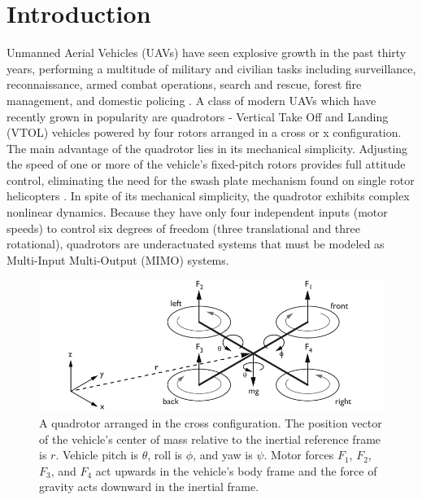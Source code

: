 \chapter{Introduction}

Unmanned Aerial Vehicles (UAVs) have seen explosive growth in the past thirty years, performing a multitude of military and civilian tasks including surveillance, reconnaissance, armed combat operations, search and rescue, forest fire management, and domestic policing \cite{sarris2001survey, valavanis2007advances}. A class of modern UAVs which have recently grown in popularity are quadrotors -  Vertical Take Off and Landing (VTOL) vehicles powered by four rotors arranged in a cross or x configuration. The main advantage of the quadrotor lies in its mechanical simplicity. Adjusting the speed of one or more of the vehicle's fixed-pitch rotors provides full attitude control, eliminating the need for the swash plate mechanism found on single rotor helicopters \cite{bramwell2001bramwell, gupte2012survey}. In spite of its mechanical simplicity, the quadrotor exhibits complex nonlinear dynamics. Because they have only four independent inputs (motor speeds) to control six degrees of freedom (three translational and three rotational), quadrotors are underactuated systems that must be modeled as Multi-Input Multi-Output (MIMO) systems.
\begin{figure}[htb!]
	\centering
	\includegraphics{../fig/quad.pdf}
	\caption[A quadrotor arranged in the cross configuration.]{A quadrotor arranged in the cross configuration. The position vector of the vehicle's center of mass relative to the inertial reference frame is $r$. Vehicle pitch is $\theta$, roll is $\phi$, and yaw is $\psi$. Motor forces $F_1$, $F_2$, $F_3$, and $F_4$ act upwards in the vehicle's body frame and the force of gravity acts downward in the inertial frame.}
\end{figure}


